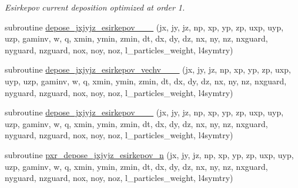 \begin{DoxyCompactItemize}
\begin{DoxyCompactList}\small\item\em Esirkepov current deposition optimized at order 1. \end{DoxyCompactList}\item 
subroutine \hyperlink{current__deposition_8_f90_a1b0279f68e8d25ed75dea74ec525c04b}{depose\+\_\+jxjyjz\+\_\+esirkepov\+\_\+\_\+\_} (jx, jy, jz, np, xp, yp, zp, uxp, uyp, uzp, gaminv, w, q, xmin, ymin, zmin,                                                                                                                                                   dt, dx, dy, dz, nx, ny, nz, nxguard, nyguard, nzguard,                                                                                                                                                   nox, noy, noz, l\+\_\+particles\+\_\+weight, l4symtry)
\item 
subroutine \hyperlink{current__deposition_8_f90_aa0e11e28c778e0f5357c21b9326ff40d}{depose\+\_\+jxjyjz\+\_\+esirkepov\+\_\+vechv\+\_\+\_\+\_} (jx, jy, jz, np, xp, yp, zp, uxp, uyp, uzp, gaminv, w, q, xmin, ymin, zmin,                                                                                                                                                   dt, dx, dy, dz, nx, ny, nz, nxguard, nyguard, nzguard,                                                                                                                                                   nox, noy, noz, l\+\_\+particles\+\_\+weight, l4symtry)
\item 
subroutine \hyperlink{current__deposition_8_f90_a764fd99e306237a96ae8675235ca96bb}{depose\+\_\+jxjyjz\+\_\+esirkepov\+\_\+\_\+\_} (jx, jy, jz, np, xp, yp, zp, uxp, uyp, uzp, gaminv, w, q, xmin, ymin, zmin,                                                                                                                                                   dt, dx, dy, dz, nx, ny, nz, nxguard, nyguard, nzguard,                                                                                                                                                   nox, noy, noz, l\+\_\+particles\+\_\+weight, l4symtry)
\item 
subroutine \hyperlink{current__deposition_8_f90_addb36b5ec8b753baa5098db4d6de7820}{pxr\+\_\+depose\+\_\+jxjyjz\+\_\+esirkepov\+\_\+n} (jx, jy, jz, np, xp, yp, zp, uxp, uyp, uzp, gaminv, w, q, xmin, ymin, zmin, dt, dx, dy, dz, nx, ny, nz, nxguard, nyguard, nzguard, nox, noy, noz, l\+\_\+particles\+\_\+weight, l4symtry)

\end{DoxyCompactItemize}
